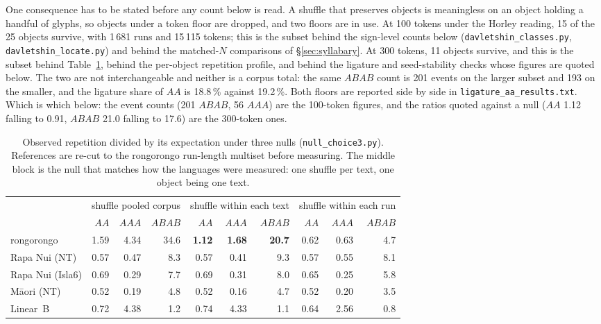 \documentclass[11pt,a4paper]{article}
\begin{document}
One consequence has to be stated before any count below is read. A shuffle that preserves objects is meaningless on an object holding a handful of glyphs, so objects under a token floor are dropped, and two floors are in use. At 100 tokens under the Horley reading, 15 of the 25 objects survive, with 1\,681 runs and 15\,115 tokens; this is the subset behind the sign-level counts below (\texttt{davletshin\_classes.py}, \texttt{davletshin\_locate.py}) and behind the matched-$N$ comparisons of \S\ref{sec:syllabary}. At 300 tokens, 11 objects survive, and this is the subset behind Table~\ref{tab:nulls}, behind the per-object repetition profile, and behind the ligature and seed-stability checks whose figures are quoted below. The two are not interchangeable and neither is a corpus total: the same $ABAB$ count is 201 events on the larger subset and 193 on the smaller, and the ligature share of $AA$ is 18.8\,\% against 19.2\,\%. Both floors are reported side by side in \texttt{ligature\_aa\_results.txt}. Which is which below: the event counts (201 $ABAB$, 56 $AAA$) are the 100-token figures, and the ratios quoted against a null ($AA$ 1.12 falling to 0.91, $ABAB$ 21.0 falling to 17.6) are the 300-token ones.

\begin{table}[t]
\centering\small
\begin{tabular}{l rrr rrr rrr}
\toprule
 & \multicolumn{3}{c}{shuffle pooled corpus} & \multicolumn{3}{c}{shuffle within each text} & \multicolumn{3}{c}{shuffle within each run} \\
\cmidrule(lr){2-4}\cmidrule(lr){5-7}\cmidrule(lr){8-10}
 & $AA$ & $AAA$ & $ABAB$ & $AA$ & $AAA$ & $ABAB$ & $AA$ & $AAA$ & $ABAB$ \\
\midrule
rongorongo            & 1.59 & 4.34 & 34.6 & \textbf{1.12} & \textbf{1.68} & \textbf{20.7} & 0.62 & 0.63 & 4.7 \\
Rapa Nui (NT)         & 0.57 & 0.47 & 8.3 & 0.57 & 0.41 & 9.3 & 0.57 & 0.55 & 8.1 \\
Rapa Nui (Isla6)      & 0.69 & 0.29 & 7.7 & 0.69 & 0.31 & 8.0 & 0.65 & 0.25 & 5.8 \\
M\=aori (NT)          & 0.52 & 0.19 & 4.8 & 0.52 & 0.16 & 4.7 & 0.52 & 0.20 & 3.5 \\
Linear~B              & 0.72 & 4.38 & 1.2 & 0.74 & 4.33 & 1.1 & 0.64 & 2.56 & 0.8 \\
\bottomrule
\end{tabular}
\caption{Observed repetition divided by its expectation under three nulls (\texttt{null\_choice3.py}). References are re-cut to the rongorongo run-length multiset before measuring. The middle block is the null that matches how the languages were measured: one shuffle per text, one object being one text.}
\label{tab:nulls}
\end{table}
\end{document}
